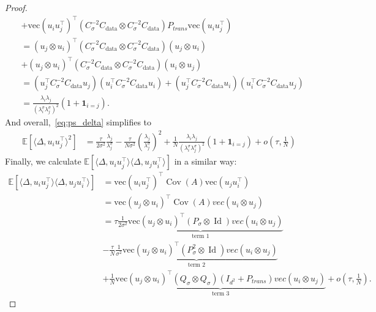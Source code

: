 \documentclass[11pt]{article}
\newcommand{\id}{\operatorname{Id}}
\newcommand{\EE}{\mathbb{E}}
\newcommand{\cov}{\operatorname{Cov}}
\begin{document}
\begin{proof}
\begin{align*}
    &+ \nonumber \text{vec}(u_i u_j^\top)^\top (C_\sigma^{-2} C_\mathrm{data} \otimes C_\sigma^{-2} C_\mathrm{data}) P_{trans} \text{vec}(u_i u_j^\top) \\
     &= (u_j \otimes u_i)^\top (C_\sigma^{-2} C_\mathrm{data} \otimes C_\sigma^{-2} C_\mathrm{data})  (u_j \otimes u_i) \\
     &+ \nonumber (u_j \otimes u_i)^\top (C_\sigma^{-2} C_\mathrm{data} \otimes C_\sigma^{-2} C_\mathrm{data})  (u_i \otimes u_j) \\
    &= (u_j^\top C_\sigma^{-2} C_\mathrm{data} u_j) (u_i^\top C_\sigma^{-2} C_\mathrm{data}  u_i) + (u_j^\top C_\sigma^{-2} C_\mathrm{data} u_i) (u_i^\top  C_\sigma^{-2} C_\mathrm{data} u_j) \\
    &= \frac{\lambda_i \lambda_j}{(\lambda^\sigma_i \lambda^\sigma_j)^2}( 1  + \mathbf{1}_{i=j}).
    \end{align*}
And overall,~\eqref{eq:ps_delta} simplifies to
\begin{align*}
     \EE[\langle \Delta, u_i u_j^\top \rangle ^2]
      &=  \frac{\tau}{2\sigma^2} \frac{\lambda_j}{\lambda^\sigma_j} - \frac{\tau}{N \sigma^2 } \left( \frac{\lambda_j}{\lambda^\sigma_j}\right)^2 + \frac{1}{N}\frac{\lambda_i \lambda_j}{(\lambda^\sigma_i \lambda^\sigma_j)^2}( 1  + \mathbf{1}_{i=j})  + o \left(\tau, \frac{1}{N}\right) 
    \end{align*}
Finally, we calculate $\EE[\langle \Delta, u_i u_j^\top \rangle \langle \Delta, u_j u_i^\top \rangle ] $ in a similar way:
\begin{align} 
\EE[\langle \Delta, u_i u_j^\top \rangle \langle \Delta, u_j u_i^\top \rangle ]  
      &=\text{vec}(u_i u_j^\top)^\top \cov(A) \text{vec}(u_j u_i^\top) \\
    &= \text{vec}(u_j \otimes u_i)^\top \cov(A) vec(u_i \otimes u_j) \\
    &= \tau  \underbrace{ \frac{1}{2\sigma^2} \text{vec}(u_j \otimes u_i)^\top (P_\sigma \otimes \id) vec(u_i \otimes u_j)}_{\text{term 1}}  \label{eq:ps_delta_2} \\
    &- \nonumber \frac{\tau}{N}  \underbrace{\frac{1}{\sigma^2} \text{vec}(u_j \otimes u_i)^\top (P_\sigma^2 \otimes \id) vec(u_i \otimes u_j)}_{\text{term 2}} \\ \nonumber &+ \frac{1}{N} \underbrace{\text{vec}(u_j \otimes u_i)^\top \left( Q_\sigma \otimes Q_\sigma \right) (I_{d^2} + P_{trans}) vec(u_i \otimes u_j)}_{\text{term 3}} + o \left(\tau, \frac{1}{N}\right) .

\end{align}
\end{proof}
\end{document}

